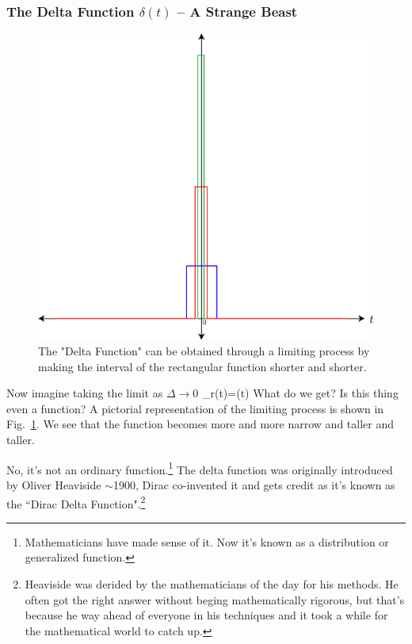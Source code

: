 

\subsubsection{The Delta Function $\delta(t)$ -- A Strange Beast}




\begin{figure}[tb]
\begin{center}
\includegraphics[width=.5\columnwidth]{rect_func_delta}
\end{center}
\caption{The "Delta Function" can be obtained through a limiting process by making the interval of the rectangular function shorter and shorter. } \label{fig:rect_func_delta}
\end{figure}


Now imagine taking the limit as $\Delta\rightarrow 0$
\be
	\lim_{\Delta{}}{r\left(t\right)=\delta(t)}
\ee
What do we get?  Is this thing even a function?  A pictorial representation of the limiting process is shown in Fig.~\ref{fig:rect_func_delta}.  We see that the function becomes more and more narrow and taller and taller.

 No, it's not an ordinary function.\footnote{Mathematicians have made sense of it.  Now it's known as a distribution or generalized function.}  The delta function was originally introduced by Oliver Heaviside $\sim$1900, Dirac co-invented it and gets credit as it's known as the ``Dirac Delta Function".\footnote{Heaviside was derided by the mathematicians of the day for his methods.  He often got the right answer without beging mathematically rigorous, but that's because he way ahead of everyone in his techniques and it took a while for the mathematical world to catch up.}
 




